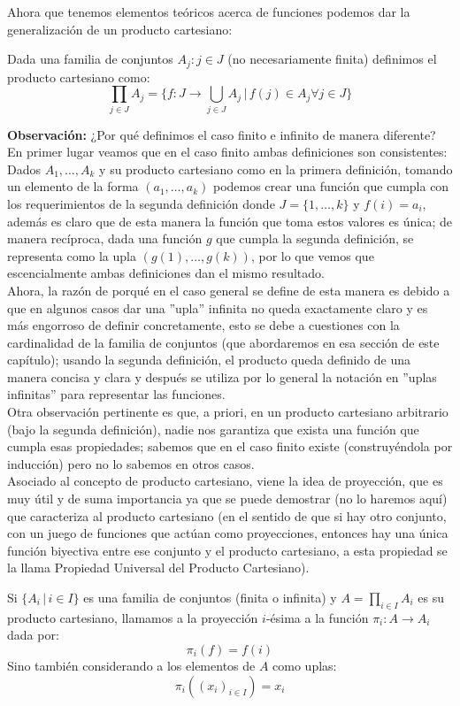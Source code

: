 \documentclass[12pt,a4paper]{book}
\begin{document}
Ahora que tenemos elementos teóricos acerca de funciones podemos dar la generalización de un producto cartesiano:
\begin{defi} %
Dada una familia de conjuntos $ A_j : j \in J $ (no necesariamente finita) definimos el producto cartesiano como:
$$ \prod_{j \in J} A_j = \lbrace f: J \rightarrow \bigcup_{j \in J} A_j \,\vert\, f(j) \in A_j \forall j\in J \} $$
\end{defi}

\textbf{Observación:} ¿Por qué definimos el caso finito e infinito de manera diferente? En primer lugar veamos que en el caso finito ambas definiciones son consistentes: Dados $A_1 , \ldots , A_k$ y su producto cartesiano como en la primera definición, tomando un elemento de la forma $(a_1, \ldots,a_k)$ podemos crear una función que cumpla con los requerimientos de la segunda definición donde $ J = \{1 , \ldots , k\}$ y $f(i)=a_i$, además es claro que de esta manera la función que toma estos valores es única; de manera recíproca, dada una función $g$ que cumpla la segunda definición, se representa como la upla $(g(1), \ldots , g(k))$, por lo que vemos que escencialmente ambas definiciones dan el mismo resultado.\\
Ahora, la razón de porqué en el caso general se define de esta manera es debido a que en algunos casos dar una ''upla'' infinita no queda exactamente claro y es más engorroso de definir concretamente, esto se debe a cuestiones con la cardinalidad de la familia de conjuntos (que abordaremos en esa sección de este capítulo); usando la segunda definición, el producto queda definido de una manera concisa y clara y después se utiliza por lo general la notación en ''uplas infinitas'' para representar las funciones.\\Otra observación pertinente es que, a priori, en un producto cartesiano arbitrario (bajo la segunda definición), nadie nos garantiza que exista una función que cumpla esas propiedades; sabemos que en el caso finito existe (construyéndola por inducción) pero no lo sabemos en otros casos. \\[0.5cm]	
Asociado al concepto de producto cartesiano, viene la idea de proyección, que es muy útil y de suma importancia ya que se puede demostrar (no lo haremos aquí) que caracteriza al producto cartesiano (en el sentido de que si hay otro conjunto, con un juego de funciones que actúan como proyecciones, entonces hay una única función biyectiva entre ese conjunto y el producto cartesiano, a esta propiedad se la llama Propiedad Universal del Producto Cartesiano).
\begin{defi}
Si $\{A_i \,\vert\, i \in I\}$ es una familia de conjuntos (finita o infinita) y $A = \prod_{i \in I} A_i$ es su producto cartesiano, llamamos a la proyección $i$-ésima a la función $\pi_i:A \rightarrow A_i$ dada por:
$$ \pi_i(f) = f(i)$$
Sino también considerando a los elementos de $A$ como uplas: 
$$ \pi_i((x_i)_{i\in I}) = x_i$$
\end{defi}
\end{document}
